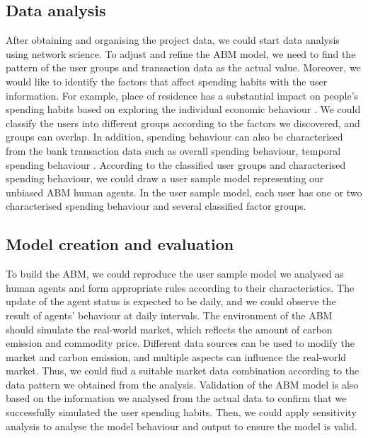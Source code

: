 \documentclass[a4paper,11pt]{article}
\begin{document}
\subsection{Data analysis}
After obtaining and organising the project data, we could start data analysis using network science. 
To adjust and refine the ABM model, we need to find the pattern of the user groups and transaction data as the actual value.
Moreover, we would like to identify the factors that affect spending habits with the user information. 
For example, place of residence has a substantial impact on people's spending habits based on exploring the individual economic behaviour \cite{city_bx}.
We could classify the users into different groups according to the factors we discovered, and groups can overlap. In addition, spending behaviour can also be characterised from the bank transaction data such as overall spending behaviour, temporal spending behaviour \cite{psy_bx}.
According to the classified user groups and characterised spending behaviour, we could draw a user sample model representing our unbiased ABM human agents. In the user sample model, each user has one or two characterised spending behaviour and several classified factor groups.

\subsection{Model creation and evaluation}
To build the ABM, we could reproduce the user sample model we analysed as human agents and form appropriate rules according to their characteristics. 
The update of the agent status is expected to be daily, and we could observe the result of agents' behaviour at daily intervals.
The environment of the ABM should simulate the real-world market, which reflects the amount of carbon emission and commodity price. Different data sources can be used to modify the market and carbon emission, and multiple aspects can influence the real-world market. Thus, we could find a suitable market data combination according to the data pattern we obtained from the analysis.
Validation of the ABM model is also based on the information we analysed from the actual data to confirm that we successfully simulated the user spending habits. Then, we could apply sensitivity analysis to analyse the model behaviour and output to ensure the model is valid.
\end{document}

